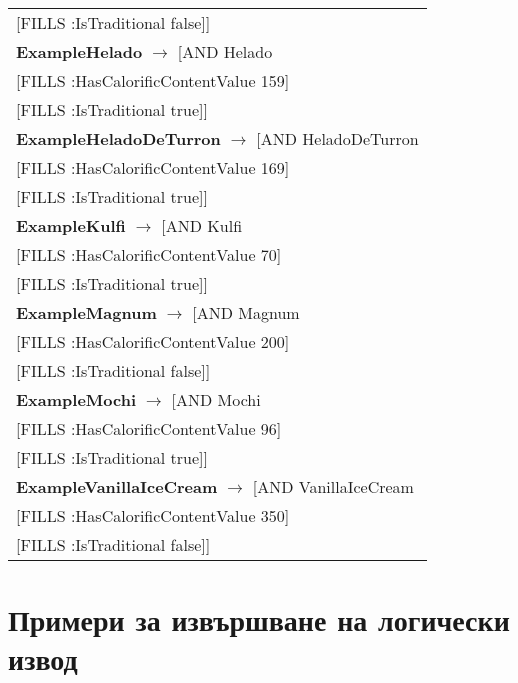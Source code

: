 \documentclass[12pt]{article}
\newcommand*{\MyIndent}{\hspace*{7em}}
\begin{document}
\begin{tabularx}{1\textwidth}{@{}X@{}}
                            \MyIndent [FILLS :IsTraditional false]]
                            \tabularnewline
            \textbf{ExampleHelado} $\rightarrow$ [AND Helado \\
                            \MyIndent [FILLS :HasCalorificContentValue 159] \\
                            \MyIndent [FILLS :IsTraditional true]]
                            \tabularnewline
            \textbf{ExampleHeladoDeTurron} $\rightarrow$ [AND HeladoDeTurron \\
                            \MyIndent [FILLS :HasCalorificContentValue 169] \\
                            \MyIndent [FILLS :IsTraditional true]]
                            \tabularnewline
            \textbf{ExampleKulfi} $\rightarrow$ [AND Kulfi \\
                            \MyIndent [FILLS :HasCalorificContentValue 70] \\
                            \MyIndent [FILLS :IsTraditional true]]
                            \tabularnewline
            \textbf{ExampleMagnum} $\rightarrow$ [AND Magnum \\
                            \MyIndent [FILLS :HasCalorificContentValue 200] \\
                            \MyIndent [FILLS :IsTraditional false]]
                            \tabularnewline
            \textbf{ExampleMochi} $\rightarrow$ [AND Mochi \\
                            \MyIndent [FILLS :HasCalorificContentValue 96] \\
                            \MyIndent [FILLS :IsTraditional true]]
                            \tabularnewline
            \textbf{ExampleVanillaIceCream} $\rightarrow$ [AND VanillaIceCream \\
                            \MyIndent [FILLS :HasCalorificContentValue 350] \\
                            \MyIndent [FILLS :IsTraditional false]]
                            \tabularnewline


        \bottomrule
        \end{tabularx}
  
    
    
    

\section{Примери за извършване на логически извод}
\end{document}
